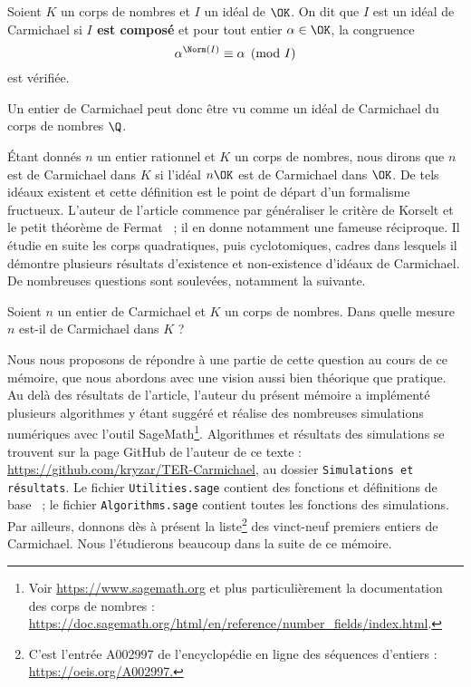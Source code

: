 \begin{definition} Soient $K$ un corps de nombres et $I$ un idéal de $\OK$. On dit que $I$ est un idéal de Carmichael si \textbf{$I$ est composé} et pour tout entier $\alpha \in \OK$, la congruence \[\alpha^{\Norm(I)} \equiv \alpha \pmod{I}\] est vérifiée.
\end{definition}

\begin{remarque}
	Un entier de Carmichael peut donc être vu comme un idéal de Carmichael du corps de nombres $\Q$.
\end{remarque}

Étant donnés $n$ un entier rationnel et $K$ un corps de nombres, nous dirons que $n$ est de Carmichael dans $K$ si l'idéal $n\OK$ est de Carmichael dans $\OK$. De tels idéaux existent et cette définition est le point de départ d'un formalisme fructueux. L'auteur de l'article commence par généraliser le critère de Korselt et le petit théorème de Fermat ~; il en donne notamment une fameuse réciproque. Il étudie en suite les corps quadratiques, puis cyclotomiques, cadres dans lesquels il démontre plusieurs résultats d'existence et non-existence d'idéaux de Carmichael. De nombreuses questions sont soulevées, notamment la suivante. 

\begin{question}\label{question-centrale}Soient $n$ un entier de Carmichael et $K$ un corps de nombres. Dans quelle mesure $n$ est-il de Carmichael dans $K$ ?
\end{question}

Nous nous proposons de répondre à une partie de cette question au cours de ce mémoire, que nous abordons avec une vision aussi bien théorique que pratique. Au delà des résultats de l'article, l'auteur du présent mémoire a implémenté plusieurs algorithmes y étant suggéré et réalise des nombreuses simulations numériques avec l'outil SageMath\footnote{Voir \url{https://www.sagemath.org} et plus particulièrement la documentation des corps de nombres : \url{https://doc.sagemath.org/html/en/reference/number\_fields/index.html}.}. Algorithmes et résultats des simulations se trouvent sur la page GitHub de l'auteur de ce texte : \url{https://github.com/kryzar/TER-Carmichael}, au dossier \texttt{Simulations et résultats}. Le fichier \texttt{Utilities.sage} contient des fonctions et définitions de base ~; le fichier \texttt{Algorithms.sage} contient toutes les fonctions des simulations. Par ailleurs, donnons dès à présent la liste\footnote{C’est l'entrée A002997 de l'encyclopédie en ligne des séquences d’entiers : \url{https://oeis.org/A002997.}} des vinct-neuf premiers entiers de Carmichael. Nous l'étudierons beaucoup dans la suite de ce mémoire.

